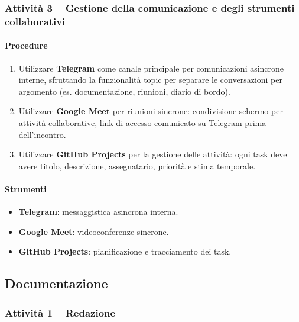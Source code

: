 \documentclass[a4paper, 11pt, oneside]{scrartcl}
\begin{document}
\subsubsection{Attività 3 – Gestione della comunicazione e degli strumenti collaborativi}

\paragraph{Procedure}
\begin{enumerate}
    \item Utilizzare \textbf{Telegram} come canale principale per comunicazioni asincrone interne, sfruttando la funzionalità topic{\scriptsize{}} per separare le conversazioni per argomento (es. documentazione, riunioni, diario di bordo).
    \item Utilizzare \textbf{Google Meet} per riunioni sincrone: condivisione schermo per attività collaborative, link di accesso comunicato su Telegram prima dell'incontro.
    \item Utilizzare \textbf{GitHub Projects} per la gestione delle attività: ogni task deve avere titolo, descrizione, assegnatario, priorità e stima temporale.
\end{enumerate}

\paragraph{Strumenti}
\begin{itemize}
    \item \textbf{Telegram}: messaggistica asincrona interna.
    \item \textbf{Google Meet}: videoconferenze sincrone.
    \item \textbf{GitHub Projects}: pianificazione e tracciamento dei task.
\end{itemize}

\subsection{Documentazione}
\label{sec:documentazione}

\subsubsection{Attività 1 – Redazione}
\end{document}

